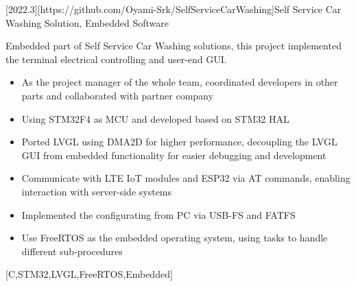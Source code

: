 \documentclass[en]{resume}
\begin{document}
\begin {projects}
	[2022.3][https://github.com/Oyami-Srk/SelfServiceCarWashing]{Self Service Car Washing Solution, Embedded Software}{
		Embedded part of Self Service Car Washing solutions, this project implemented the terminal electrical controlling and user-end GUI.
		\begin{itemize}
			\item As the project manager of the whole team, coordinated developers in other parts and collaborated with partner company
			\item Using STM32F4 as MCU and developed based on STM32 HAL
			\item Ported LVGL using DMA2D for higher performance, decoupling the LVGL GUI from embedded functionality for easier debugging and development
			\item Communicate with LTE IoT modules and ESP32 via AT commands, enabling interaction with server-side systems
			\item Implemented the configurating from PC via USB-FS and FATFS
			\item Use FreeRTOS as the embedded operating system, using tasks to handle different sub-procedures
		\end{itemize}
	}[C,STM32,LVGL,FreeRTOS,Embedded]
\end {projects}
\end{document}
